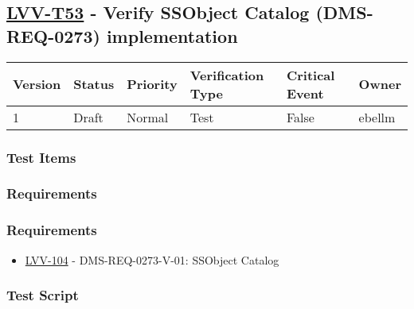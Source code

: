 \hypertarget{lvv-t53---verify-ssobject-catalog-dms-req-0273-implementation}{%
\subsection{\texorpdfstring{\href{https://jira.lsstcorp.org/secure/Tests.jspa\#/testCase/LVV-T53}{LVV-T53}
- Verify SSObject Catalog (DMS-REQ-0273)
implementation}{LVV-T53 - Verify SSObject Catalog (DMS-REQ-0273) implementation}}\label{lvv-t53---verify-ssobject-catalog-dms-req-0273-implementation}}

\begin{longtable}[]{@{}llllll@{}}
\toprule
Version & Status & Priority & Verification Type & Critical Event &
Owner\tabularnewline
\midrule
\endhead
1 & Draft & Normal & Test & False & ebellm\tabularnewline
\bottomrule
\end{longtable}

\hypertarget{test-items-30}{%
\subsubsection{Test Items}\label{test-items-30}}

\hypertarget{requirements-60}{%
\subsubsection{Requirements}\label{requirements-60}}

\hypertarget{requirements-61}{%
\subsubsection{Requirements}\label{requirements-61}}

\begin{itemize}
\tightlist
\item
  \href{https://jira.lsstcorp.org/browse/LVV-104}{LVV-104} -
  DMS-REQ-0273-V-01: SSObject Catalog
\end{itemize}

\hypertarget{test-script-30}{%
\subsubsection{Test Script}\label{test-script-30}}

